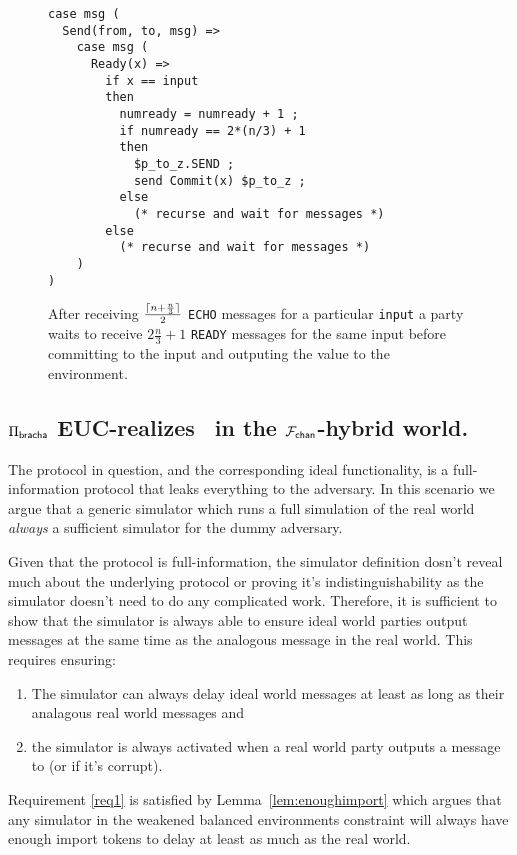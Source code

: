 \begin{figure}
\begin{lstlisting}[basicstyle=\small\ttfamily, frame=single]
case msg (
  Send(from, to, msg) =>
    case msg (
      Ready(x) =>
        if x == input
        then
          numready = numready + 1 ;
          if numready == 2*(n/3) + 1
          then
            $p_to_z.SEND ;
            send Commit(x) $p_to_z ;
          else
            (* recurse and wait for messages *)
        else
          (* recurse and wait for messages *)
    )
)
\end{lstlisting}
\caption{After receiving $\frac{\lceil n + \frac{n}{3}\rceil}{2}$ \texttt{ECHO} messages for a particular \texttt{input} a party waits to receive $2 \frac{n}{3} + 1$ \texttt{READY} messages for the same input before committing to the input and outputing the value to the environment.}
\label{fig:nomos:ready}
\end{figure}


\subsection{$\Pi_{{\mathsf {bracha}}}$ EUC-realizes \Frbc~in the $\mathcal{F}_{{\mathsf {chan}}}$-hybrid world.}
The protocol in question, and the corresponding ideal functionality, is a full-information protocol that leaks everything to the adversary.
In this scenario we argue that a generic simulator which runs a full simulation of the real world \textit{always} a sufficient simulator for the dummy adversary.

Given that the protocol is full-information, the simulator definition dosn't reveal much about the underlying protocol or proving it's indistinguishability as the simulator doesn't need to do any complicated work.
Therefore, it is sufficient to show that the simulator is always able to ensure ideal world parties output messages at the same time as the analogous message in the real world.
This requires ensuring:
\begin{enumerate}
\item \label{req1} The simulator can always delay ideal world messages at least as long as their analagous real world messages and
\item \label{req2} the simulator is always activated when a real world party outputs a message to \Environment (or \Adversary if it's corrupt).
\end{enumerate}

Requirement \ref{req1} is satisfied by Lemma~\ref{lem:enoughimport} which argues that any simulator in the weakened balanced environments constraint will always have enough import tokens to delay at least as much as the real world.

